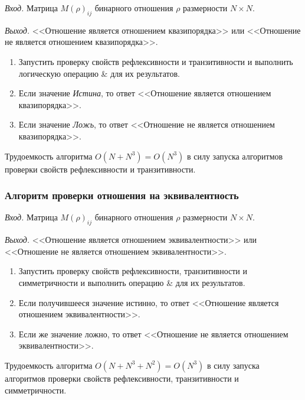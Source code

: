 \documentclass[bachelor, och, labwork]{shiza}
\begin{document}
\textit{Вход.} Матрица $M(\rho)_{ij}$ бинарного отношения $\rho$ размерности
$N \times N$.

\textit{Выход.} <<Отношение является отношением квазипорядка>> или <<Отношение 
не является отношением квазипорядка>>.

\begin{enumerate}

    \item Запустить проверку свойств рефлексивности и транзитивности и выполнить
    логическую операцию \& для их результатов.

    \item Если значение \textit{Истина}, то ответ <<Отношение является отношением
    квазипорядка>>.
    
    \item Если значение \textit{Ложь}, то ответ <<Отношение не является 
    отношением квазипорядка>>.

\end{enumerate}
Трудоемкость алгоритма $O(N+N^3) = O(N^3)$ в силу запуска алгоритмов проверки
свойств рефлексивности и транзитивности.

\subsubsection{Алгоритм проверки отношения на эквивалентность}

\textit{Вход.} Матрица $M(\rho)_{ij}$ бинарного отношения $\rho$ размерности
$N \times N$.


\textit{Выход.} <<Отношение является отношением эквивалентности>> или 
<<Отношение не является отношением эквивалентности>>.

\begin{enumerate}

    \item Запустить проверку свойств рефлексивности, транзитивности и симметричности
    и выполнить операцию \& для их результатов.

    \item Если получившееся значение истинно, то ответ <<Отношение является
    отношением эквивалентности>>.

    \item Если же значение ложно, то ответ <<Отношение не является отношением
    эквивалентности>>. 

\end{enumerate}
Трудоемкость алгоритма $O(N+N^3+N^2) = O(N^3)$ в силу запуска алгоритмов проверки
свойств рефлексивности, транзитивности и симметричности.
\end{document}

